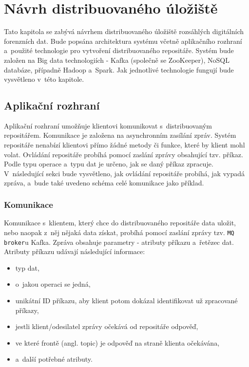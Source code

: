 \chapter{Návrh distribuovaného úložiště} \label{distrRepDesignChapter}
Tato kapitola se zabývá návrhem distribuovaného úložiště rozsáhlých digitálních forenzních dat. Bude popsána architektura systému včetně aplikačního rozhraní a~použité technologie pro vytvoření distribuovaného repositáře.
Systém bude založen na Big data technologiích - Kafka (společně se ZooKeeper), NoSQL databáze, případně Hadoop a~Spark. Jak jednotlivé technologie fungují bude vysvětleno v~této kapitole.

\section{Aplikační rozhraní}
Aplikační rozhraní umožňuje klientovi komunikovat s~distribuovaným repositářem. Komunikace je založena na asynchronním zasílání zpráv. Systém repositáře nenabízí klientovi přímo žádné metody či funkce, které by klient mohl volat. Ovládání repositáře probíhá pomocí zaslání zprávy obsahující tzv. příkaz. Podle typu operace a~typu dat je určeno, jak se daný příkaz zpracuje. V~následující sekci bude vysvětleno, jak ovládání repositáře probíhá, jak vypadá zpráva, a~bude také uvedeno schéma celé komunikace jako příklad.

\subsection{Komunikace}
Komunikace s~klientem, který chce do distribuovaného repositáře data uložit, nebo naopak z~něj nějaká data získat, probíhá pomocí zaslání zprávy tzv. \texttt{MQ broker}u Kafka. Zpráva obsahuje parametry - atributy příkazu a~řetězec dat. Atributy příkazu udávají následující informace:

\begin{itemize}
    \item typ dat,
    \item o~jakou operaci se jedná,
    \item unikátní ID příkazu, aby klient potom dokázal identifikovat už zpracované příkazy,
    \item jestli klient/odesilatel zprávy očekává od repositáře odpověď,
    \item ve které frontě (angl. topic) je odpověď na straně klienta očekávána,
    \item a~další potřebné atributy.
\end{itemize}

